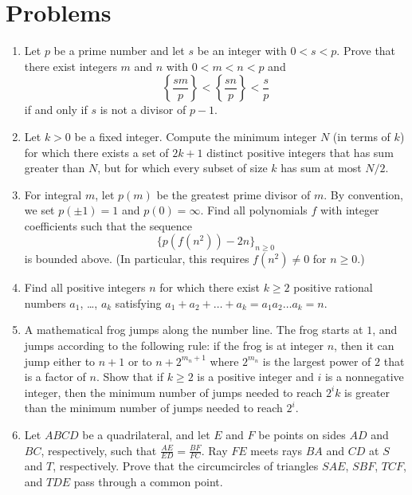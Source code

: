 \documentclass[11pt]{scrartcl}
\begin{document}
\section{Problems}
\begin{enumerate}[\bfseries 1.]
\item %
Let $p$ be a prime number and let $s$ be an integer with $0 < s < p$.
Prove that there exist integers $m$ and $n$ with $0 < m < n < p$ and
\[ \left \{\frac{sm}{p} \right\} < \left \{\frac{sn}{p} \right \} < \frac{s}{p}  \]
if and only if $s$ is not a divisor of $p-1$.

\item %
Let $k > 0$ be a fixed integer.
Compute the minimum integer $N$ (in terms of $k$) for which
there exists a set of $2k+1$ distinct positive integers
that has sum greater than $N$,
but for which every subset of size $k$ has sum at most $N/2$.

\item %
For integral $m$, let $p(m)$ be the greatest prime divisor of $m$.
By convention, we set $p(\pm 1) = 1$ and $p(0) = \infty$.
Find all polynomials $f$ with integer coefficients
such that the sequence
\[ \{ p(f(n^2)) - 2n \}_{n \geq 0}  \]
is bounded above.
(In particular, this requires $f(n^2) \neq 0$ for $n \ge 0$.)

\item %
Find all positive integers $n$ for
which there exist $k \ge 2$ positive rational
numbers $a_1$, \dots, $a_k$ satisfying
$a_1 + a_2 + \dots + a_k = a_1 a_2 \dots a_k = n$.

\item %
A mathematical frog jumps along the number line.
The frog starts at $1$, and jumps according to the following rule:
if the frog is at integer $n$,
then it can jump either to $n+1$ or to $n + 2^{m_n+1}$
where $2^{m_n}$ is the largest power of $2$ that is a factor of $n$.
Show that if $k \ge 2$ is a positive integer
and $i$ is a nonnegative integer,
then the minimum number of jumps needed to reach $2^ik$
is greater than the minimum number of jumps needed to reach $2^i$.

\item %
Let $ABCD$ be a quadrilateral,
and let $E$ and $F$ be points on sides $AD$ and $BC$,
respectively, such that $\frac{AE}{ED} = \frac{BF}{FC}$.
Ray $FE$ meets rays $BA$ and $CD$ at $S$ and $T$, respectively.
Prove that the circumcircles of triangles $SAE$, $SBF$, $TCF$, and $TDE$
pass through a common point.

\end{enumerate}
\pagebreak
\end{document}
